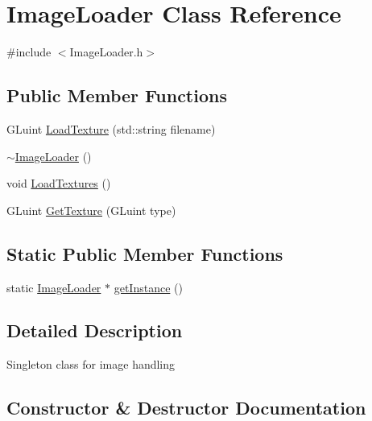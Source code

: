 \hypertarget{class_image_loader}{}\section{Image\+Loader Class Reference}
\label{class_image_loader}


{\ttfamily \#include $<$Image\+Loader.\+h$>$}

\subsection*{Public Member Functions}
\begin{DoxyCompactItemize}
\item 
G\+Luint \hyperlink{class_image_loader_ab52b48518d13ff284d7d68bf7119d943}{Load\+Texture} (std\+::string filename)
\item 
\hyperlink{class_image_loader_a844109a0a6b4e4a9513fa6822f623dcc}{$\sim$\+Image\+Loader} ()
\item 
void \hyperlink{class_image_loader_adc8753fda50916c2e53d3e071502bb74}{Load\+Textures} ()
\item 
G\+Luint \hyperlink{class_image_loader_af71479e10a84606ab284ac1293436261}{Get\+Texture} (G\+Luint type)
\end{DoxyCompactItemize}
\subsection*{Static Public Member Functions}
\begin{DoxyCompactItemize}
\item 
static \hyperlink{class_image_loader}{Image\+Loader} $\ast$ \hyperlink{class_image_loader_adf162e4bf26be1abb849ce46f9634b69}{get\+Instance} ()
\end{DoxyCompactItemize}


\subsection{Detailed Description}
Singleton class for image handling 

\subsection{Constructor \& Destructor Documentation}
\hypertarget{class_image_loader_a844109a0a6b4e4a9513fa6822f623dcc}{}
